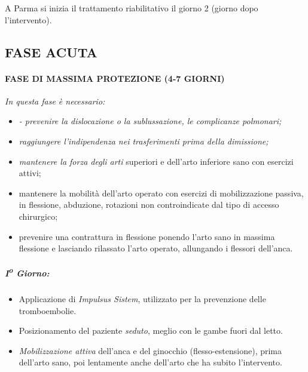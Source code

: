 A Parma si inizia il trattamento riabilitativo il giorno 2 (giorno dopo
l'intervento).


\subsection{FASE ACUTA}


\paragraph{FASE DI MASSIMA PROTEZIONE (4-7 GIORNI)}


\emph{In questa fase è necessario:}
\begin{itemize}
\item 
\emph{- prevenire la dislocazione o la sublussazione, le complicanze
polmonari;}
\item
  
  \emph{raggiungere l'indipendenza nei trasferimenti prima della
  dimissione;}
  
\item
  
  \emph{mantenere la forza degli arti} superiori e dell'arto inferiore
  sano con esercizi attivi;
  
\item
  
  mantenere la mobilità dell'arto operato con esercizi di mobilizzazione
  passiva, in flessione, abduzione, rotazioni non controindicate dal tipo di accesso chirurgico;
  
\item
  
  prevenire una contrattura in flessione ponendo l'arto sano in massima
  flessione e lasciando rilassato l'arto operato, allungando i flessori dell'anca.
  
\end{itemize}




\subparagraph{I\textsuperscript{o} Giorno:}

\begin{itemize}
\item
  Applicazione di \emph{Impulsus Sistem}, utilizzato per la prevenzione
  delle tromboembolie.
\item
  Posizionamento del paziente \emph{seduto}, meglio con le gambe fuori
  dal letto.
\item
  \emph{Mobilizzazione attiva} dell'anca e del ginocchio
  (flesso-estensione), prima dell'arto sano, poi lentamente anche
  dell'arto che ha subito l'intervento.
\end{itemize}


